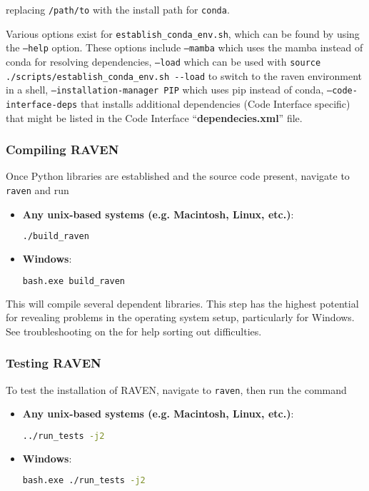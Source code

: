 replacing \texttt{/path/to} with the install path for \texttt{conda}.

\nb Various options exist for \texttt{establish\_conda\_env.sh}, which
can be found by using the \texttt{--help} option.  These options
include \texttt{--mamba} which uses the mamba instead of conda for
resolving dependencies, \texttt{--load} which can be used with
\verb'source ./scripts/establish_conda_env.sh --load' to switch to the
raven environment in a shell, \texttt{--installation-manager PIP} which
uses pip instead of conda, \texttt{--code-interface-deps} that installs additional dependencies (Code Interface specific) that might 
be listed in the Code Interface ``\textbf{dependecies.xml}'' file.


\subsubsection{Compiling RAVEN}
Once Python libraries are established and the source code present, navigate to \texttt{raven} and run


\begin{itemize}

  \item \textbf{Any unix-based systems (e.g. Macintosh, Linux, etc.)}:
\begin{lstlisting}[language=bash]
./build_raven
\end{lstlisting}
  \item \textbf{Windows}:
  \begin{lstlisting}[language=bash]
bash.exe build_raven
\end{lstlisting}
  
\end{itemize}

This will compile several dependent libraries.  This step has the highest potential for revealing problems in
the operating system setup, particularly for Windows.  See troubleshooting on the \wiki for help sorting out
difficulties.


\subsubsection{Testing RAVEN}
\label{sec:testing raven}
To test the installation of RAVEN, navigate to \texttt{raven}, then run the command

\begin{itemize}

  \item \textbf{Any unix-based systems (e.g. Macintosh, Linux, etc.)}:
\begin{lstlisting}[language=bash]
../run_tests -j2
\end{lstlisting}
  \item \textbf{Windows}:
  \begin{lstlisting}[language=bash]
bash.exe ./run_tests -j2
\end{lstlisting}
  
\end{itemize}

